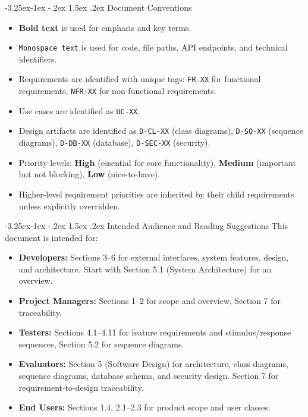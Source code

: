\documentclass[12pt,a4paper]{article}
\makeatletter
\renewcommand\subsection{\@startsection{subsection}{2}{\z@}%
  {-3.25ex\@plus -1ex \@minus -.2ex}%
  {1.5ex \@plus .2ex}%
  {\needspace{2\baselineskip}\normalfont\large\bfseries}}
\makeatother
\begin{document}
\subsection{Document Conventions}
\begin{itemize}
    \item \textbf{Bold text} is used for emphasis and key terms.
    \item \texttt{Monospace text} is used for code, file paths, API endpoints, and technical identifiers.
    \item Requirements are identified with unique tags: \texttt{FR-XX} for functional requirements, \texttt{NFR-XX} for non-functional requirements.
    \item Use cases are identified as \texttt{UC-XX}.
    \item Design artifacts are identified as \texttt{D-CL-XX} (class diagrams), \texttt{D-SQ-XX} (sequence diagrams), \texttt{D-DB-XX} (database), \texttt{D-SEC-XX} (security).
    \item Priority levels: \textbf{High} (essential for core functionality), \textbf{Medium} (important but not blocking), \textbf{Low} (nice-to-have).
    \item Higher-level requirement priorities are inherited by their child requirements unless explicitly overridden.
\end{itemize}

\subsection{Intended Audience and Reading Suggestions}
This document is intended for:
\begin{itemize}
    \item \textbf{Developers:} Sections 3--6 for external interfaces, system features, design, and architecture. Start with Section 5.1 (System Architecture) for an overview.
    \item \textbf{Project Managers:} Sections 1--2 for scope and overview, Section 7 for traceability.
    \item \textbf{Testers:} Sections 4.1--4.11 for feature requirements and stimulus/response sequences, Section 5.2 for sequence diagrams.
    \item \textbf{Evaluators:} Section 5 (Software Design) for architecture, class diagrams, sequence diagrams, database schema, and security design. Section 7 for requirement-to-design traceability.
    \item \textbf{End Users:} Sections 1.4, 2.1--2.3 for product scope and user classes.
\end{itemize}
\end{document}
